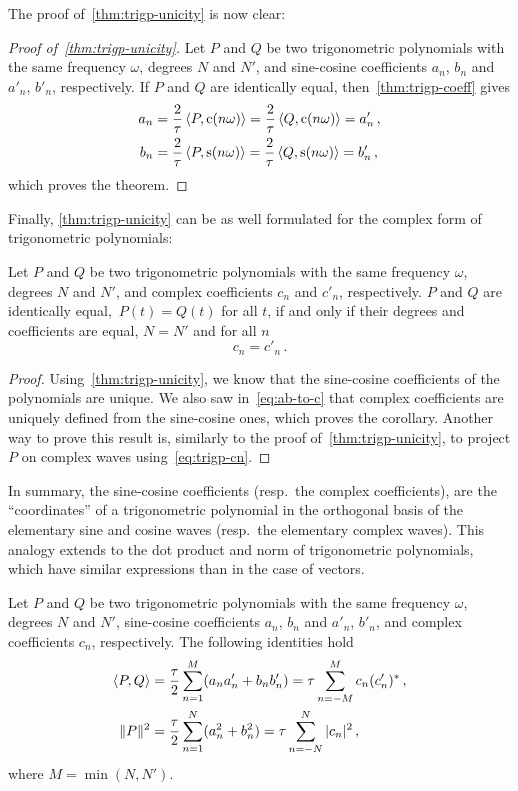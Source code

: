 The proof of~\cref{thm:trigp-unicity} is now clear:
\begin{proof}[Proof of~\cref{thm:trigp-unicity}]
  Let $P$ and $Q$ be two trigonometric polynomials with the same frequency $\omega$,
  degrees $N$ and $N'$, and sine-cosine coefficients $a_n$, $b_n$ and $a'_n$, $b'_n$,
  respectively. If $P$ and $Q$ are identically equal, then~\cref{thm:trigp-coeff} gives
  \begin{align}
    a_n&=\frac{2}{\tau}\braket{P,\operatorname{c}(n\omega)}
    =\frac{2}{\tau}\braket{Q,\operatorname{c}(n\omega)}=a_n'\,,\\
    b_n&=\frac{2}{\tau}\braket{P,\operatorname{s}(n\omega)}
    =\frac{2}{\tau}\braket{Q,\operatorname{s}(n\omega)}=b_n'\,,
  \end{align}
  which proves the theorem.
\end{proof}
Finally, \cref{thm:trigp-unicity} can be as well formulated for the complex form of
trigonometric polynomials:
\begin{corollary}
  \label{corr:trigp-unicity-cplx}
  Let $P$ and $Q$ be two trigonometric polynomials with the same frequency $\omega$,
  degrees $N$ and $N'$, and complex coefficients $c_n$ and $c'_n$, respectively. $P$ and
  $Q$ are identically equal,~\ie $P(t)=Q(t)$ for all $t$, if and only if their degrees and
  coefficients are equal, \ie $N=N'$ and for all $n$
  \begin{equation}
    c_n=c'_n\,.
  \end{equation}
\end{corollary}
\begin{proof}
  Using~\cref{thm:trigp-unicity}, we know that the sine-cosine coefficients of the
  polynomials are unique. We also saw in~\cref{eq:ab-to-c} that complex coefficients are
  uniquely defined from the sine-cosine ones, which proves the corollary. Another way to
  prove this result is, similarly to the proof of~\cref{thm:trigp-unicity}, to project $P$
  on complex waves using~\cref{eq:trigp-cn}.
\end{proof}
In summary, the sine-cosine coefficients (resp.~the complex coefficients), are the
``coordinates'' of a trigonometric polynomial in the orthogonal basis of the elementary
sine and cosine waves (resp.~the elementary complex waves). This analogy extends to the
dot product and norm of trigonometric polynomials, which have similar expressions than in
the case of vectors.
\begin{theorem}[Parseval]
  \label{thm:trigp-parseval}
  Let $P$ and $Q$ be two trigonometric polynomials with the same frequency $\omega$,
  degrees $N$ and $N'$, sine-cosine coefficients $a_n$, $b_n$ and $a'_n$, $b'_n$, and
  complex coefficients $c_n$, respectively. The following identities hold
  \begin{align}
    \braket{P,Q}&=\frac{\tau}{2}\sum_{n=1}^{M}(a_na'_n+b_nb'_n)=\tau\sum_{n=-M}^Mc_n(c'_n)^*\,,
    \label{eq:trigp-dot}\\
    \|P\|^2&=\frac{\tau}{2}\sum_{n=1}^{N}(a_n^2+b_n^2)=\tau\sum_{n=-N}^N|c_n|^2\,,
    \label{eq:trigp-norm}
  \end{align}
  where $M=\min(N,N')$.
\end{theorem}
